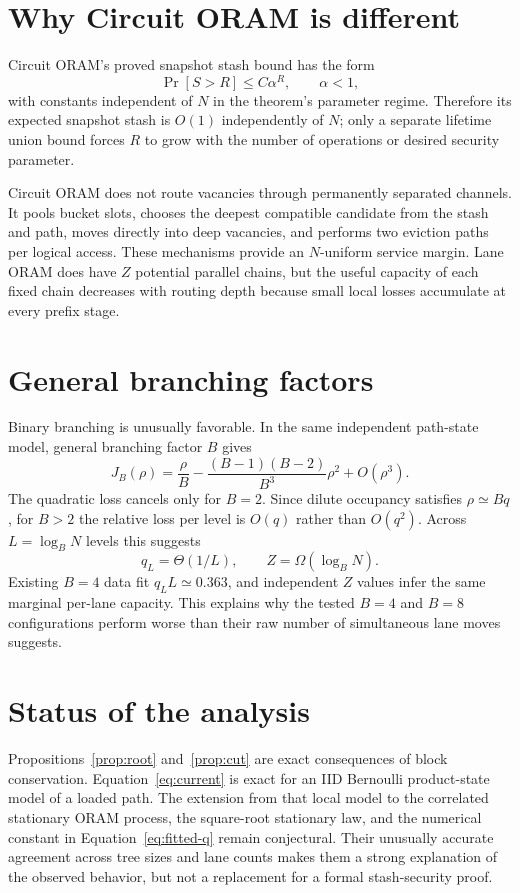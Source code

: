 \documentclass[11pt]{article}
\newcommand{\Prb}{\mathop{\mathrm{Pr}}}
\begin{document}
\section{Why Circuit ORAM is different}

Circuit ORAM's proved snapshot stash bound has the form
\[
  \Prb[S>R]\le C\alpha^R,
  \qquad \alpha<1,
\]
with constants independent of $N$ in the theorem's parameter regime.
Therefore its expected snapshot stash is $O(1)$ independently of $N$; only a
separate lifetime union bound forces $R$ to grow with the number of operations
or desired security parameter.

Circuit ORAM does not route vacancies through permanently separated channels.
It pools bucket slots, chooses the deepest compatible candidate from the
stash and path, moves directly into deep vacancies, and performs two eviction
paths per logical access.  These mechanisms provide an $N$-uniform service
margin.  Lane ORAM does have $Z$ potential parallel chains, but the useful
capacity of each fixed chain decreases with routing depth because small local
losses accumulate at every prefix stage.

\section{General branching factors}

Binary branching is unusually favorable.  In the same independent path-state
model, general branching factor $B$ gives
\[
  J_B(\rho)
  =\frac{\rho}{B}
   -\frac{(B-1)(B-2)}{B^3}\rho^2
   +O(\rho^3).
\]
The quadratic loss cancels only for $B=2$.  Since dilute occupancy satisfies
$\rho\simeq Bq$, for $B>2$ the relative loss per level is $O(q)$ rather than
$O(q^2)$.  Across $L=\log_BN$ levels this suggests
\[
  q_L=\Theta(1/L),
  \qquad Z=\Omega(\log_BN).
\]
Existing $B=4$ data fit $q_LL\simeq0.363$, and independent $Z$ values infer
the same marginal per-lane capacity.  This explains why the tested $B=4$ and
$B=8$ configurations perform worse than their raw number of simultaneous
lane moves suggests.

\section{Status of the analysis}

Propositions~\ref{prop:root} and~\ref{prop:cut} are exact consequences of
block conservation.  Equation~\eqref{eq:current} is exact for an IID
Bernoulli product-state model of a loaded path.  The extension from that local
model to the correlated stationary ORAM process, the square-root stationary
law, and the numerical constant in Equation~\eqref{eq:fitted-q} remain
conjectural.  Their unusually accurate agreement across tree sizes and lane
counts makes them a strong explanation of the observed behavior, but not a
replacement for a formal stash-security proof.
\end{document}
